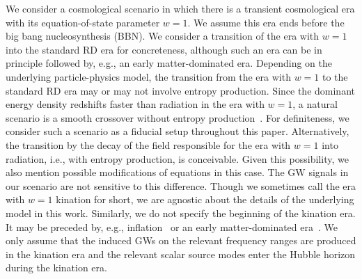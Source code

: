 \documentclass[superscriptaddress, aps, preprintnumbers,
amsmath, amssymb, sort&compress, nofootinbib, 10pt, paper, floatfix]{revtex4-2}
\begin{document}
We consider a cosmological scenario in which there is a transient cosmological era with its equation-of-state parameter $w = 1$.  We assume this era ends before the big bang nucleosynthesis (BBN). 
We consider a transition of the era with $w=1$ into the standard RD era for concreteness,
although such an era can be in principle followed by, e.g., an early matter-dominated era. Depending on the underlying particle-physics model, the transition from the era with $w=1$ to the standard RD era may or may not involve entropy production. Since the dominant energy density redshifts faster than radiation in the era with $w=1$, a natural scenario is a smooth crossover without entropy production~\cite{Co:2021lkc, Gouttenoire:2021jhk}.  For definiteness, we consider such a scenario as a fiducial setup throughout this paper.  Alternatively, the transition by the decay of the field responsible for the era with $w=1$ into radiation, i.e., with entropy production, is conceivable. Given this possibility, we also mention possible modifications of equations in this case. 
The GW signals in our scenario are not sensitive to this difference.  Though we sometimes call the era with $w=1$ kination for short, we are agnostic about the details of the underlying model in this work.
Similarly, we do not specify the beginning of the kination era.  It may be preceded by, e.g., inflation~\cite{Spokoiny:1993kt} or an early matter-dominated era~\cite{Co:2019wyp,Co:2021lkc, Gouttenoire:2021jhk}. We only assume that the induced GWs on the relevant frequency ranges are produced in the kination era and the relevant scalar source modes enter the Hubble horizon during the kination era.
\end{document}
